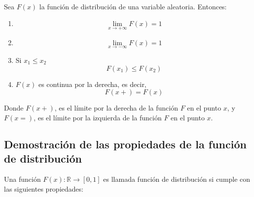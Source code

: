 \begin{tcolorbox}[colback=gray!5!white,colframe=gray!60!black,title=Propiedades: Función de Distribución]
    Sea $F(x)$ la función de distribución de una variable aleatoria. Entonces:

    \begin{enumerate}
        \item \begin{equation}
            \lim_{x \rightarrow +\infty} F(x) =1
        \end{equation}

        \item \begin{equation}
            \lim_{x \rightarrow -\infty} F(x) =1
        \end{equation}

        \item Si $x_1 \leq x_2$
        \begin{equation}
            F(x_1) \leq F(x_2)
        \end{equation}

        \item $F(x)$ es continua por la derecha, es decir,
        \begin{equation}
            F(x+) = F(x)
        \end{equation}
    \end{enumerate}

Donde $F(x+)$, es el límite por la derecha de la función $F$ en el punto $x$, y
$F(x=)$, es el límite por la izquierda de la función $F$ en el punto $x$.

\end{tcolorbox}

\subsection{Demostración de las propiedades de la función de distribución}

Una función $F(x) : \mathbb{R} \rightarrow [0,1]$ es llamada función de
distribución si cumple con las siguientes propiedades:

